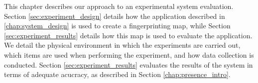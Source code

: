 This chapter describes our approach to an experimental system evaluation.
Section \ref{sec:experiment_design} details how the application described in \ref{chap:system_design} is used to create a fingerprinting map, while Section \ref{sec:experiment_results} details how this map is used to evaluate the application.
We detail the physical environment in which the experiments are carried out, which items are used when performing the experiment, and how data collection is conducted.
Section \ref{sec:experiment_results} evaluates the results of the system in terms of adequate acucracy, as described in Section \ref{chap:presence_intro}. 